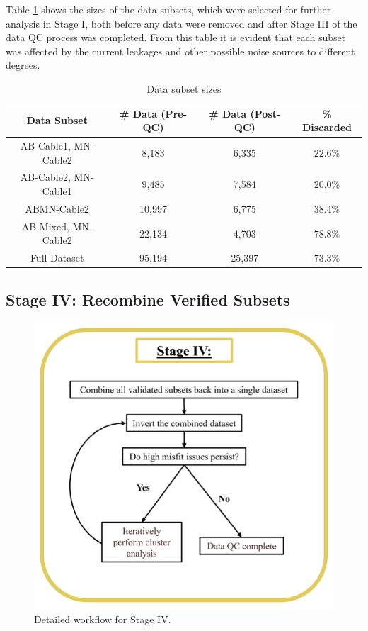 \documentclass[final,authoryear,5p,times,twocolumn]{elsarticle}
\begin{document}
Table \ref{tab:DataSubsetSizes} shows the sizes of the data subsets, which were selected for further analysis in Stage I, both before any data were removed and after Stage III of the data QC process was completed. From this table it is evident that each subset was affected by the current leakages and other possible noise sources to different degrees.

\begin{table}[!ht]
\scriptsize
\begin{center}
  \begin{tabular}{| c | c | c | c |}
    \hline
    \bf{Data Subset} & \bf{\# Data (Pre-QC)} & \bf{\# Data (Post-QC)} & \bf{\% Discarded} \\
    \hline
    AB-Cable1, MN-Cable2 & 8,183 & 6,335 & $22.6 \%$ \\
    \hline
    AB-Cable2, MN-Cable1 & 9,485 & 7,584 & $20.0 \%$\\
    \hline
    ABMN-Cable2 & 10,997 & 6,775 & $38.4 \%$\\
    \hline
    AB-Mixed, MN-Cable2  & 22,134 & 4,703 & $78.8 \%$\\
    \hline
    Full Dataset  & 95,194 & 25,397 & $73.3 \%$\\
    \hline
  \end{tabular}
\caption{Data subset sizes}
\label{tab:DataSubsetSizes}
\end{center}
\end{table}

\subsection{Stage IV: Recombine Verified Subsets}
\label{Data_Quality_Control:StageIV_Recombine_Subsets}

\begin{figure} [!ht]
\begin{center}
   \includegraphics[trim=0cm 0cm 0cm 0cm, clip=true,width=0.75\linewidth]{./Figures/Fig16.png}
\end{center}
\caption{Detailed workflow for Stage IV.}
\label{fig:DataQC_workflow_StageIV}
\end{figure}
\end{document}

